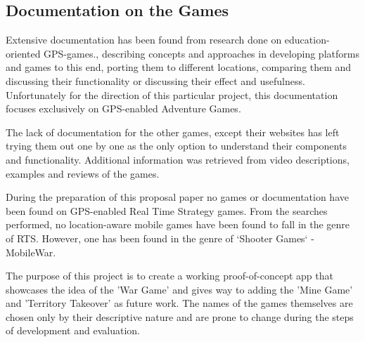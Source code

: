 \documentclass{article}
\begin{document}
\subsection{Documentation on the Games}
Extensive documentation has been found from research done on education-oriented
GPS-games.\cite{pbarg1}\cite{pbarg2}\cite{pbarg3}\cite{pbarg4}\cite{pbarg5}\cite{pbarg6},
describing concepts and approaches in developing platforms and games to this
end\cite{pbarg3}, porting them to different locations\cite{pbarg4}, comparing
them and discussing their functionality\cite{pbarg6}\cite{pbarg1}\cite{pbarg2}
or discussing their effect and usefulness\cite{pbarg1}. Unfortunately for the
direction of this particular project, this documentation focuses exclusively on
GPS-enabled Adventure Games.\newline

The lack of documentation for the other games, except their websites has left
trying them out one by one as the only option to understand their components and
functionality. Additional information was retrieved from video descriptions,
examples and reviews of the games.\newline

During the preparation of this proposal paper no games or documentation have
been found on GPS-enabled Real Time Strategy games. From the searches performed,
no location-aware mobile games have been found to fall in the genre of RTS.
However, one has been found in the genre of `Shooter Games` - MobileWar.\newline

The purpose of this project is to create a working proof-of-concept app
that showcases the idea of the 'War Game' and gives way to adding the 'Mine
Game' and 'Territory Takeover' as future work. The names of the games themselves
are chosen only by their descriptive nature and are prone to change during the
steps of development and evaluation.
\end{document}

